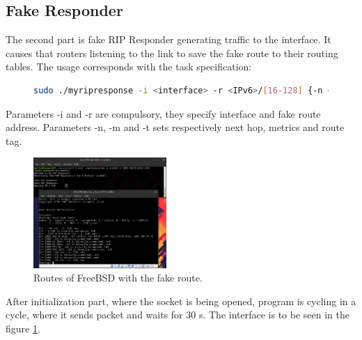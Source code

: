 \documentclass[10pt,a4paper,titlepage]{article}
\begin{document}
        \subsection{Fake Responder}
            The second part is fake RIP Responder generating traffic to the
            interface. It causes that routers listening to the link to save
            the fake route to their routing tables.  The usage corresponds
            with the task specification:
            \begin{figure}[h!]
            \begin{lstlisting}[language=sh, basicstyle=\tiny]
sudo ./myripresponse -i <interface> -r <IPv6>/[16-128] {-n <IPv6>} {-m [0-16]} {-t [0-65535]}
            \end{lstlisting}
            \end{figure}

            Parameters -i and -r are compulsory, they specify interface and fake route address.
            Parameters -n, -m and -t sets respectively next hop, metrics and route tag.


            \begin{figure}[h!]
                \begin{center}
                    \includegraphics[width=0.45\textwidth]{freebsdroutes.png}
                    \caption{Routes of FreeBSD with the fake route.\label{fig:FreeBSDRoutes}}
                \end{center}
            \end{figure}

            After initialization part, where the socket is being opened, program is cycling in a cycle, where it
            sends packet and waits for 30 s. The interface is to be seen in the figure \ref{fig:FreeBSDRoutes}.
\end{document}
